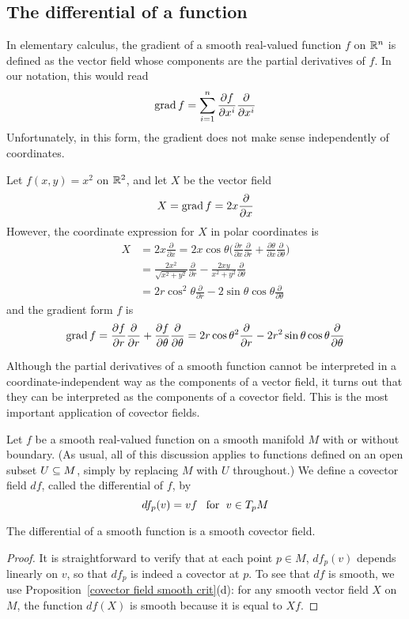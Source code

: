 \subsection{The differential of a function}
In elementary calculus, the gradient of a smooth real-valued function $f$ on $\mathbb{R}^n$ is defined as the vector field whose components are the partial derivatives of $f$. In our notation, this would read
\[\mathrm{grad}\, f=\sum_{i=1}^{n}\frac{\partial f}{\partial x^i}\frac{\partial}{\partial x^i}\]
Unfortunately, in this form, the gradient does not make sense independently of coordinates.
\begin{example}
Let $f(x,y)=x^2$ on $\mathbb{R}^2$, and let $X$ be the vector field
\[X=\mathrm{grad}\, f=2x\frac{\partial}{\partial x}\]
However, the coordinate expression for $X$ in polar coordinates is
\begin{align*}
X&=2x\frac{\partial}{\partial x}=2x\cos\theta\Big(\frac{\partial r}{\partial x}\frac{\partial}{\partial r}+\frac{\partial\theta}{\partial x}\frac{\partial}{\partial\theta}\Big)\\
&=\frac{2x^2}{\sqrt{x^2+y^2}}\frac{\partial}{\partial r}-\frac{2xy}{x^2+y^2}\frac{\partial}{\partial\theta}\\
&=2r\cos^2\theta\frac{\partial}{\partial r}-2\sin\theta\cos\theta\frac{\partial}{\partial\theta}
\end{align*}
and the gradient form $f$ is
\[\mathrm{grad}\, f=\frac{\partial f}{\partial r}\frac{\partial}{\partial r}+\frac{\partial f}{\partial\theta}\frac{\partial}{\partial\theta}=2r\cos\theta^2\frac{\partial}{\partial r}-2r^2\sin\theta\cos\theta\frac{\partial}{\partial\theta}\]
\end{example}
Although the partial derivatives of a smooth function cannot be interpreted in a coordinate-independent way as the components of a vector field, it turns out that they can be interpreted as the components of a covector field. This is the most important application of covector fields.\par
Let $f$ be a smooth real-valued function on a smooth manifold $M$ with or without boundary. (As usual, all of this discussion applies to functions defined on an open subset $U\subseteq M$, simply by replacing $M$ with $U$ throughout.) We define a covector field $df$, called the differential of $f$, by
\[df_p(v)=vf\hspace{8pt}\text{for}\hspace{6pt} v\in T_pM\]
\begin{proposition}
The differential of a smooth function is a smooth covector field.
\end{proposition}
\begin{proof}
It is straightforward to verify that at each point $p\in M$, $df_p(v)$ depends linearly on $v$, so that $df_p$ is indeed a covector at $p$. To see that $df$ is smooth, we use Proposition~\ref{covector field smooth crit}(d): for any smooth vector field $X$ on $M$, the function $df(X)$ is smooth because it is equal to $Xf$.
\end{proof}
